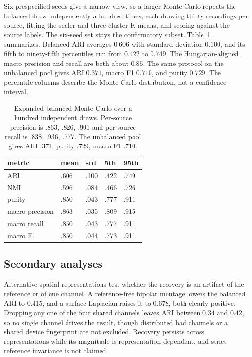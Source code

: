 Six prespecified seeds give a narrow view, so a larger Monte Carlo
repeats the balanced draw independently a hundred times, each drawing
thirty recordings per source, fitting the scaler and three-cluster
K-means, and scoring against the source labels. The six-seed set stays
the confirmatory subset. Table~\ref{tab:montecarlo}
summarizes. Balanced ARI averages \(0.606\) with standard deviation
\(0.100\), and its fifth to ninety-fifth percentiles run from \(0.422\)
to \(0.749\). The Hungarian-aligned macro precision and recall are both
about \(0.85\). The same protocol on the unbalanced pool gives ARI
\(0.371\), macro F1 \(0.710\), and purity \(0.729\). The percentile
columns describe the Monte Carlo distribution, not a confidence
interval.

\begin{table}[htbp]
\centering
\small
\setlength{\tabcolsep}{4pt}
\caption{Expanded balanced Monte Carlo over a hundred independent draws. Per-source precision is .863, .826, .901 and per-source recall is .838, .936, .777. The unbalanced pool gives ARI .371, purity .729, macro F1 .710.}
\label{tab:montecarlo}
\begin{tabular}{lllll}
\hline
metric & mean & std & 5th & 95th\\
\hline
ARI & .606 & .100 & .422 & .749\\
NMI & .596 & .084 & .466 & .726\\
purity & .850 & .043 & .777 & .911\\
macro precision & .863 & .035 & .809 & .915\\
macro recall & .850 & .043 & .777 & .911\\
macro F1 & .850 & .044 & .773 & .911\\
\hline
\end{tabular}

\end{table}

\subsection{Secondary analyses}\label{secondary-analyses}

Alternative spatial representations test whether the recovery is an
artifact of the reference or of one channel. A reference-free bipolar
montage lowers the balanced ARI to \(0.415\), and a surface Laplacian
raises it to \(0.678\), both clearly positive. Dropping any one of the
four shared channels leaves ARI between \(0.34\) and \(0.42\), so no
single channel drives the result, though distributed bad channels or a
shared device fingerprint are not excluded. Recovery persists across
representations while its magnitude is representation-dependent, and
strict reference invariance is not claimed.

